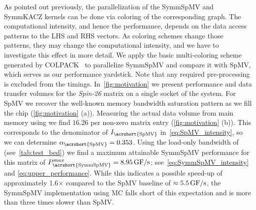 
As pointed out previously, the parallelization of the \acrshort{SymmSpMV} and \acrshort{SymmKACZ} kernels can be done via \DTWO coloring of the corresponding graph. The computational intensity, and hence the performance, depends on the data access patterns to the LHS and RHS vectors. As coloring schemes change those patterns, they may change the computational intensity, and we have to investigate this effect in more detail. We apply the basic multi-coloring scheme generated by COLPACK~\cite{COLPACK} to parallelize \acrshort{SymmSpMV} and compare it with \acrshort{SpMV}, which serves as our performance yardstick. Note that any required pre-processing is excluded from the timings. In~\cref{fig:motivation} we present performance and data transfer volumes for the \emph{Spin-26} matrix on a single socket of the \IVB system. For \acrshort{SpMV} we recover the well-known memory bandwidth saturation pattern as we fill the chip (\cref{fig:motivation} (a)). Measuring the actual data volume from main memory using \LIKWID we find $16.26$ \BYTE per non-zero matrix entry (\cref{fig:motivation} (b)). This corresponds to the denominator of $I_\mathrm{\acrshort{SpMV}}$ in~\cref{eq:SpMV_intensity}, so we can determine $\alpha_\mathrm{\acrshort{SpMV}}=0.353$. Using the load-only bandwidth of \IVB (see~\cref{tab:test_bed}) we find a maximum attainable {\acrshort{SymmSpMV}} performance for this matrix of $P^{max}_\mathrm{\acrshort{SymmSpMV}}=8.95\,\GF$; see~\cref{eq:SymmSpMV_intensity} and \cref{eq:upper_performance}. While this indicates a possible speed-up of approximately 1.6$\times$ compared to the \acrshort{SpMV} baseline of $\approx 5.5\,\mbox{GF/s}$, the \acrshort{SymmSpMV} implementation using \acrfull{MC} falls short of this expectation and is more than three times slower than \acrshort{SpMV}. 
